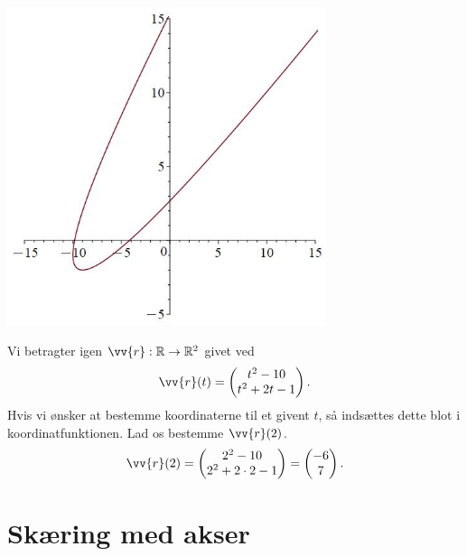 \begin{exa}
\begin{center}
		\includegraphics[width=0.7\textwidth]{Billeder/vektor2.jpg}
	\end{center}
\end{exa}

\begin{exa}
	Vi betragter igen $\vv{r}:\mathbb{R} \to \mathbb{R}^2$ givet ved
	\begin{align*}
		\vv{r}(t) = 
		\begin{pmatrix}
			t^2-10 \\
			t^2+2t-1
		\end{pmatrix}.
	\end{align*}
	Hvis vi ønsker at bestemme koordinaterne til et givent $t$, så indsættes dette blot i koordinatfunktionen. Lad os bestemme $\vv{r}(2)$.
	\begin{align*}
		\vv{r}(2) =
		\begin{pmatrix}
			2^2-10 \\
			2^2+2\cdot 2 -1
		\end{pmatrix}
		=
		\begin{pmatrix}
			-6 \\
			7
		\end{pmatrix}.
	\end{align*}
\end{exa}

\section*{Skæring med akser}

